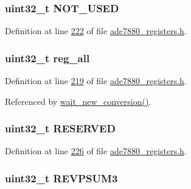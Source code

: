 \hypertarget{a00032_aa979856ee90a694e453f80dde4e52bc7}{
\subsubsection[{N\-O\-T\-\_\-\-U\-S\-E\-D}]{\setlength{\rightskip}{0pt plus 5cm}uint32\-\_\-t N\-O\-T\-\_\-\-U\-S\-E\-D}}\label{dc/d87/a00032_aa979856ee90a694e453f80dde4e52bc7}


Definition at line \hyperlink{a00036_source_l00222}{222} of file \hyperlink{a00036_source}{ade7880\-\_\-registers.\-h}.

\hypertarget{a00032_ae44a0232a79ff51b5ef7aa80e4b35470}{
\subsubsection[{reg\-\_\-all}]{\setlength{\rightskip}{0pt plus 5cm}uint32\-\_\-t reg\-\_\-all}}\label{dc/d87/a00032_ae44a0232a79ff51b5ef7aa80e4b35470}


Definition at line \hyperlink{a00036_source_l00219}{219} of file \hyperlink{a00036_source}{ade7880\-\_\-registers.\-h}.



Referenced by \hyperlink{a00035_source_l00122}{wait\-\_\-new\-\_\-conversion()}.

\hypertarget{a00032_a0e5030971ec1bfd3101f83f546493c83}{
\subsubsection[{R\-E\-S\-E\-R\-V\-E\-D}]{\setlength{\rightskip}{0pt plus 5cm}uint32\-\_\-t R\-E\-S\-E\-R\-V\-E\-D}}\label{dc/d87/a00032_a0e5030971ec1bfd3101f83f546493c83}


Definition at line \hyperlink{a00036_source_l00226}{226} of file \hyperlink{a00036_source}{ade7880\-\_\-registers.\-h}.

\hypertarget{a00032_a07697224a4919cedc8988eb9013c6d5b}{
\subsubsection[{R\-E\-V\-P\-S\-U\-M3}]{\setlength{\rightskip}{0pt plus 5cm}uint32\-\_\-t R\-E\-V\-P\-S\-U\-M3}}\label{dc/d87/a00032_a07697224a4919cedc8988eb9013c6d5b}


